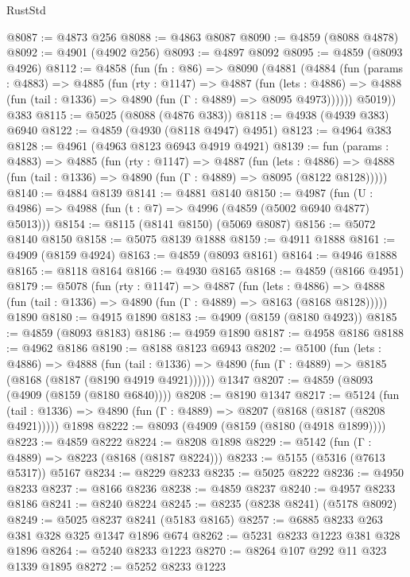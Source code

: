 \begin{lexlean}{RustStd}
\begin{coremodule}
@8087 := @4873 @256
@8088 := @4863 @8087
@8090 := @4859 (@8088 @4878)
@8092 := @4901 (@4902 @256)
@8093 := @4897 @8092
@8095 := @4859 (@8093 @4926)
@8112 := @4858
    (fun (fn : @86) =>
    @8090
      (@4881
        (@4884
          (fun (params : @4883) =>
          @4885
            (fun (rty : @1147) =>
            @4887
              (fun (lets : @4886) =>
              @4888 (fun (tail : @1336) => @4890 (fun (Γ : @4889) => @8095 @4973))))))
        @5019))
    @383
@8115 := @5025 (@8088 (@4876 @383))
@8118 := @4938 (@4939 @383) @6940
@8122 := @4859 (@4930 (@8118 @4947) @4951)
@8123 := @4964 @383
@8128 := @4961 (@4963 @8123 @6943 @4919 @4921)
@8139 := fun (params : @4883) =>
  @4885
    (fun (rty : @1147) =>
    @4887
      (fun (lets : @4886) =>
      @4888 (fun (tail : @1336) => @4890 (fun (Γ : @4889) => @8095 (@8122 @8128)))))
@8140 := @4884 @8139
@8141 := @4881 @8140
@8150 := @4987 (fun (U : @4986) => @4988 (fun (t : @7) => @4996 (@4859 (@5002 @6940 @4877) @5013)))
@8154 := @8115 (@8141 @8150) (@5069 @8087)
@8156 := @5072 @8140 @8150
@8158 := @5075 @8139 @1888
@8159 := @4911 @1888
@8161 := @4909 (@8159 @4924)
@8163 := @4859 (@8093 @8161)
@8164 := @4946 @1888
@8165 := @8118 @8164
@8166 := @4930 @8165
@8168 := @4859 (@8166 @4951)
@8179 := @5078
    (fun (rty : @1147) =>
    @4887
      (fun (lets : @4886) =>
      @4888 (fun (tail : @1336) => @4890 (fun (Γ : @4889) => @8163 (@8168 @8128)))))
    @1890
@8180 := @4915 @1890
@8183 := @4909 (@8159 (@8180 @4923))
@8185 := @4859 (@8093 @8183)
@8186 := @4959 @1890
@8187 := @4958 @8186
@8188 := @4962 @8186
@8190 := @8188 @8123 @6943
@8202 := @5100
    (fun (lets : @4886) =>
    @4888
      (fun (tail : @1336) => @4890 (fun (Γ : @4889) => @8185 (@8168 (@8187 (@8190 @4919 @4921))))))
    @1347
@8207 := @4859 (@8093 (@4909 (@8159 (@8180 @6840))))
@8208 := @8190 @1347
@8217 := @5124
    (fun (tail : @1336) => @4890 (fun (Γ : @4889) => @8207 (@8168 (@8187 (@8208 @4921)))))
    @1898
@8222 := @8093 (@4909 (@8159 (@8180 (@4918 @1899))))
@8223 := @4859 @8222
@8224 := @8208 @1898
@8229 := @5142 (fun (Γ : @4889) => @8223 (@8168 (@8187 @8224)))
@8233 := @5155 (@5316 (@7613 @5317)) @5167
@8234 := @8229 @8233
@8235 := @5025 @8222
@8236 := @4950 @8233
@8237 := @8166 @8236
@8238 := @4859 @8237
@8240 := @4957 @8233 @8186
@8241 := @8240 @8224
@8245 := @8235 (@8238 @8241) (@5178 @8092)
@8249 := @5025 @8237 @8241 (@5183 @8165)
@8257 := @6885 @8233 @263 @381 @328 @325 @1347 @1896 @674
@8262 := @5231 @8233 @1223 @381 @328 @1896
@8264 := @5240 @8233 @1223
@8270 := @8264 @107 @292 @11 @323 @1339 @1895
@8272 := @5252 @8233 @1223

\end{coremodule}
\end{lexlean}
